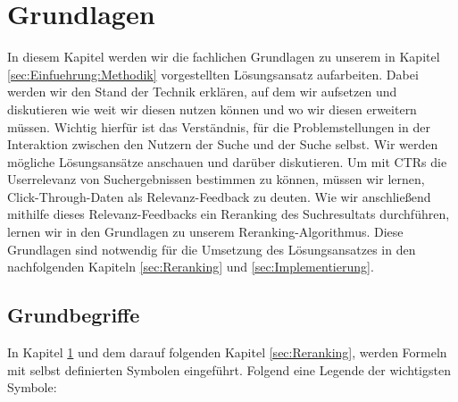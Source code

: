 %
\chapter{Grundlagen}
\label{sec:Grundlagen}

In diesem Kapitel werden wir die fachlichen Grundlagen zu unserem in Kapitel \ref{sec:Einfuehrung:Methodik} vorgestellten Lösungsansatz aufarbeiten. Dabei werden wir den Stand der Technik erklären, auf dem wir aufsetzen und diskutieren wie weit wir diesen nutzen können und wo wir diesen erweitern müssen. Wichtig hierfür ist das Verständnis, für die Problemstellungen in der Interaktion zwischen den Nutzern der Suche und der Suche selbst. Wir werden mögliche Lösungsansätze anschauen und darüber diskutieren. Um mit CTRs die Userrelevanz von Suchergebnissen bestimmen zu können, müssen wir lernen, Click-Through-Daten als Relevanz-Feedback zu deuten. Wie wir anschließend mithilfe dieses Relevanz-Feedbacks ein Reranking des Suchresultats durchführen, lernen wir in den Grundlagen zu unserem Reranking-Algorithmus. Diese Grundlagen sind notwendig für die Umsetzung des Lösungsansatzes in den nachfolgenden Kapiteln \ref{sec:Reranking} und \ref{sec:Implementierung}. 


\section{Grundbegriffe}
\label{sec:Grundlagen:Grundbegriffe}

In Kapitel \ref{sec:Grundlagen} und dem darauf folgenden Kapitel \ref{sec:Reranking}, werden Formeln mit selbst definierten Symbolen eingeführt. Folgend eine Legende der wichtigsten Symbole:


